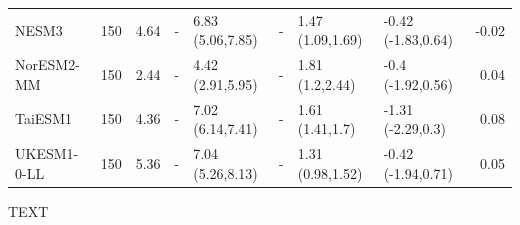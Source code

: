 \documentclass[esd, article]{copernicus}
\begin{document}
\begin{table}[t]
\begin{tabular}{llrrlrllr}
           NESM3 &   150 &       4.64 &         - &  6.83 (5.06,7.85) &       - &  1.47 (1.09,1.69) &  -0.42 (-1.83,0.64) &        -0.02 \\
      NorESM2-MM &   150 &       2.44 &         - &  4.42 (2.91,5.95) &       - &   1.81 (1.2,2.44) &   -0.4 (-1.92,0.56) &         0.04 \\
         TaiESM1 &   150 &       4.36 &         - &  7.02 (6.14,7.41) &       - &   1.61 (1.41,1.7) &   -1.31 (-2.29,0.3) &         0.08 \\
     UKESM1-0-LL &   150 &       5.36 &         - &  7.04 (5.26,8.13) &       - &  1.31 (0.98,1.52) &  -0.42 (-1.94,0.71) &         0.05 \\
\bottomrule
\end{tabular}
\label{tbl:CMIP6}

\end{table}




\begin{acknowledgements}
TEXT
\end{acknowledgements}






\end{document}
